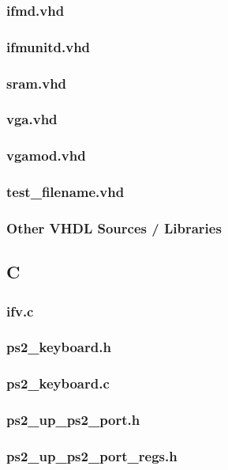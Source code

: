 \documentclass{article}
\begin{document}
\subsubsection{ifmd.vhd}							%
\subsubsection{ifmunitd.vhd}						%
\subsubsection{sram.vhd}							%
\subsubsection{vga.vhd}							%
\subsubsection{vgamod.vhd}							%
\subsubsection{test\_filename.vhd}					%
\subsubsection{Other VHDL Sources / Libraries}

\subsection{C}
\subsubsection{ifv.c}								%
\subsubsection{ps2\_keyboard.h}					%
\subsubsection{ps2\_keyboard.c}					%
\subsubsection{ps2\_up\_ps2\_port.h}				%
\subsubsection{ps2\_up\_ps2\_port\_regs.h}			%
\end{document}
